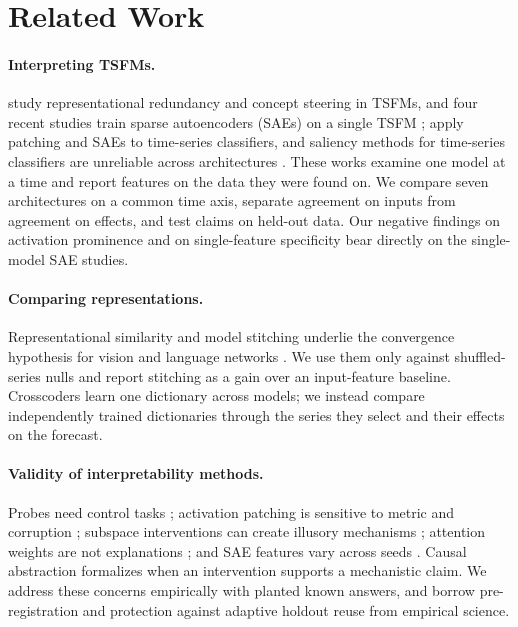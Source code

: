 \section{Related Work}
\label{sec:related}

\paragraph{Interpreting TSFMs.} \citet{wilinski2025exploring} study representational redundancy and concept steering in
TSFMs, and four recent studies train sparse autoencoders (SAEs) on a single TSFM
\citep{mishra2026dissecting,oublal2026timesae,divo2026zeitgeist,yildirim2026superposition}; \citet{kalnare2025mechts}
apply patching and SAEs to time-series classifiers, and saliency methods for time-series classifiers are unreliable
across architectures \citep{ismail2020benchmarking}. These works examine one model at a time and report features on
the data they were found on. We compare seven architectures on a common time axis, separate agreement on inputs from
agreement on effects, and test claims on held-out data. Our negative findings on activation prominence and on
single-feature specificity bear directly on the single-model SAE studies.

\paragraph{Comparing representations.} Representational similarity
\citep{raghu2017svcca,morcos2018pwcca,kornblith2019cka,kriegeskorte2008rsa} and model stitching
\citep{lenc2015equivariance,bansal2021stitching} underlie the convergence hypothesis for vision and language networks
\citep{li2016convergent,huh2024platonic}. We use them only against shuffled-series nulls and report stitching as a gain
over an input-feature baseline. Crosscoders \citep{lindsey2024crosscoders} learn one dictionary across models; we instead
compare independently trained dictionaries through the series they select and their effects on the forecast.

\paragraph{Validity of interpretability methods.} Probes need control tasks \citep{hewitt2019control,belinkov2022probing};
activation patching is sensitive to metric and corruption \citep{zhang2024patching,heimersheim2024patching}; subspace
interventions can create illusory mechanisms \citep{makelov2024illusion}; attention weights are not explanations
\citep{jain2019attention}; and SAE features vary across seeds \citep{paulo2025seeds}. Causal abstraction
\citep{geiger2021causal} formalizes when an intervention supports a mechanistic claim. We address these concerns
empirically with planted known answers, and borrow pre-registration \citep{nosek2018preregistration} and protection
against adaptive holdout reuse \citep{dwork2015reusable,gelman2014garden} from empirical science.
